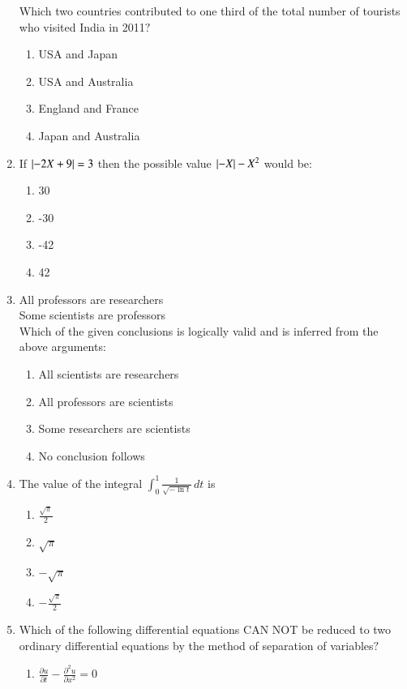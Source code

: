 \documentclass[journal]{IEEEtran}
\begin{document}
\begin{enumerate}[start=1]
\begin{table}[h!]
	\centering
	
\end{table}
Which two countries contributed to one third of the total number of tourists who visited India in 2011$?$
\begin{enumerate}
    \item USA and Japan
    \item USA and Australia 
    \item England and France
    \item Japan and Australia
\end{enumerate}
\item If $\left\vert-2X+9\right\vert=3$ then the possible value $\left\vert-X\right\vert-X^2$  would be:
\begin{multicols}{4}
\begin{enumerate}
    \item 30
    \item -30
    \item -42
    \item 42
\end{enumerate}
\end{multicols}
\item All professors are researchers \\
Some scientists are professors \\
Which of the given conclusions is logically valid and is inferred from the above arguments:
\begin{enumerate}
    \item All scientists are researchers 
    \item All professors are scientists
    \item Some researchers are scientists 
    \item No conclusion follows
\end{enumerate}
\item The value of the integral $\int_{0}^{1} \frac{1}{\sqrt{-\ln{t}}} \, dt$ is
\begin{multicols}{4}
    \begin{enumerate}
        \item $\frac{\sqrt{\pi}}{2}$
        \item $\sqrt{\pi}$
        \item $-\sqrt{\pi}$
        \item $-\frac{\sqrt{\pi}}{2}$
    \end{enumerate}
\end{multicols}
\item Which of the following differential equations CAN NOT be reduced to two ordinary differential equations by the method of separation of variables$?$
\begin{multicols}{2}
    \begin{enumerate}
        \item $\frac{\partial u}{\partial t}-\frac{\partial^2 u}{\partial x^2}=0$
        

\end{enumerate}
\end{multicols}
\end{enumerate}
\end{document}
